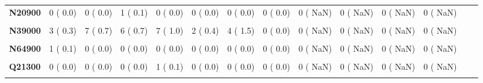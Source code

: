 \documentclass[
]{article}
\begin{document}
\begin{table}[H]
\begin{tabular}[t]{>{\raggedright\arraybackslash}p{5em}ccccccccccccc}
\textbf{N20900} & 0 (  0.0) & 0 (  0.0) & 1 (  0.1) & 0 (  0.0) & 0 (  0.0) & 0 (  0.0) & 0 (  0.0) & 0 (  NaN) & 0 (  NaN) & 0 (  NaN) & 0 (  NaN) &  & \\
\textbf{\cellcolor{gray!10}{N28900}} & \cellcolor{gray!10}{0 (  0.0)} & \cellcolor{gray!10}{0 (  0.0)} & \cellcolor{gray!10}{1 (  0.1)} & \cellcolor{gray!10}{0 (  0.0)} & \cellcolor{gray!10}{1 (  0.2)} & \cellcolor{gray!10}{0 (  0.0)} & \cellcolor{gray!10}{1 (  0.4)} & \cellcolor{gray!10}{0 (  NaN)} & \cellcolor{gray!10}{0 (  NaN)} & \cellcolor{gray!10}{0 (  NaN)} & \cellcolor{gray!10}{0 (  NaN)} & \cellcolor{gray!10}{} & \cellcolor{gray!10}{}\\
\textbf{N39000} & 3 (  0.3) & 7 (  0.7) & 6 (  0.7) & 7 (  1.0) & 2 (  0.4) & 4 (  1.5) & 0 (  0.0) & 0 (  NaN) & 0 (  NaN) & 0 (  NaN) & 0 (  NaN) &  & \\
\textbf{\cellcolor{gray!10}{N40000}} & \cellcolor{gray!10}{0 (  0.0)} & \cellcolor{gray!10}{0 (  0.0)} & \cellcolor{gray!10}{0 (  0.0)} & \cellcolor{gray!10}{0 (  0.0)} & \cellcolor{gray!10}{0 (  0.0)} & \cellcolor{gray!10}{0 (  0.0)} & \cellcolor{gray!10}{1 (  0.4)} & \cellcolor{gray!10}{0 (  NaN)} & \cellcolor{gray!10}{0 (  NaN)} & \cellcolor{gray!10}{0 (  NaN)} & \cellcolor{gray!10}{0 (  NaN)} & \cellcolor{gray!10}{} & \cellcolor{gray!10}{}\\
\textbf{N64900} & 1 (  0.1) & 0 (  0.0) & 0 (  0.0) & 0 (  0.0) & 0 (  0.0) & 0 (  0.0) & 0 (  0.0) & 0 (  NaN) & 0 (  NaN) & 0 (  NaN) & 0 (  NaN) &  & \\
\textbf{\cellcolor{gray!10}{Q21000}} & \cellcolor{gray!10}{1 (  0.1)} & \cellcolor{gray!10}{0 (  0.0)} & \cellcolor{gray!10}{0 (  0.0)} & \cellcolor{gray!10}{1 (  0.1)} & \cellcolor{gray!10}{0 (  0.0)} & \cellcolor{gray!10}{0 (  0.0)} & \cellcolor{gray!10}{0 (  0.0)} & \cellcolor{gray!10}{0 (  NaN)} & \cellcolor{gray!10}{0 (  NaN)} & \cellcolor{gray!10}{0 (  NaN)} & \cellcolor{gray!10}{0 (  NaN)} & \cellcolor{gray!10}{} & \cellcolor{gray!10}{}\\
\textbf{Q21300} & 0 (  0.0) & 0 (  0.0) & 0 (  0.0) & 1 (  0.1) & 0 (  0.0) & 0 (  0.0) & 0 (  0.0) & 0 (  NaN) & 0 (  NaN) & 0 (  NaN) & 0 (  NaN) &  & \\
\textbf{\cellcolor{gray!10}{Q61300}} & \cellcolor{gray!10}{0 (  0.0)} & \cellcolor{gray!10}{0 (  0.0)} & \cellcolor{gray!10}{1 (  0.1)} & \cellcolor{gray!10}{0 (  0.0)} & \cellcolor{gray!10}{0 (  0.0)} & \cellcolor{gray!10}{0 (  0.0)} & \cellcolor{gray!10}{0 (  0.0)} & \cellcolor{gray!10}{0 (  NaN)} & \cellcolor{gray!10}{0 (  NaN)} & \cellcolor{gray!10}{0 (  NaN)} & \cellcolor{gray!10}{0 (  NaN)} & \cellcolor{gray!10}{} & \cellcolor{gray!10}{}\\

\end{tabular}
\end{table}
\end{document}
